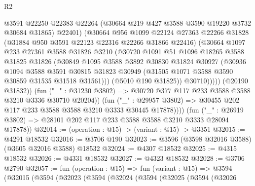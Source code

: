 \begin{lexlean}{R2}
\begin{coremodule}
                        @3591
                        @22250
                        @22383
                        @22264
                        (@30664 @219 @427 @3588 @3590 @19220 @3732 @30684 @31865)
                        @22401)
                      (@30664
                        @956
                        @1099
                        @22124
                        @27363
                        @22266
                        @31828
                        (@31884 @950 @3591 @22123 @22316 @22266 @31866 @22416)
                        (@30664
                          @1097
                          @233
                          @27361
                          @3588
                          @31826
                          @3210
                          (@30720
                            @1091
                            @51
                            @1096
                            @18265
                            @3588
                            @31825
                            @31826
                            (@30849
                              @1095
                              @3588
                              @3892
                              @30830
                              @31824
                              @30927
                              (@30936
                                @1094
                                @3588
                                @3591
                                @30815
                                @31823
                                @30949
                                (@31505 @1071 @3588 @3590 @30859 @31535 @31518 @31561)))
                            (@5010 @190 @31825))
                          @30710)))))
                (@20190 @31832))
              (fun ("_" : @31230 @3802) =>
              @30720 @377 @117 @233 @3588 @3588 @3210 @3336 @30710 @20204))
            (fun ("_" : @29957 @3802) =>
            @30455 @202 @117 @233 @3588 @3588 @3210 @3333 @30445 @17878))))
      (fun ("_" : @26919 @3802) => @28101 @202 @117 @233 @3588 @3588 @3210 @3333 @28094 @17878))
@32014 := (operation : @15) -> (variant : @15) -> @3351
@32015 := @4291 @18532
@32016 := @3706 @190
@32023 := @3596 (@3598 @32016 @3588) (@3605 @32016 @3588) @18532
@32024 := @4307 @18532
@32025 := @4315 @18532
@32026 := @4331 @18532
@32027 := @4323 @18532
@32028 := @3706 @2790
@32057 := fun (operation : @15) =>
  fun (variant : @15) =>
  @3594
    (@32015
      (@3594
        (@32023
          (@3594
            (@32024
              (@3594
                (@32025
                  (@3594
                    (@32026

\end{coremodule}
\end{lexlean}
